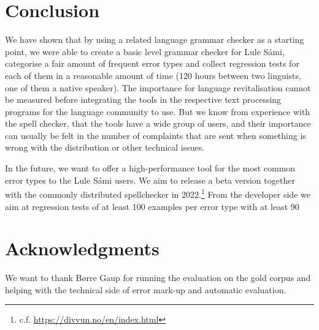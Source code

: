 \documentclass[free]{flammie}
\begin{document}
\section{Conclusion}

We have shown that by using a related language grammar checker as a starting
point, we were able to create a basic level grammar checker for Lule Sámi,
categorise a fair amount of frequent error types and collect regression tests
for each of them in a reasonable amount of time (120 hours between two
linguists, one of them a native speaker).  The importance for language
revitalisation cannot be measured before integrating the tools in the respective
text processing programs for the language community to use. But we know from
experience with the spell checker, that the tools have a wide group of users,
and their importance can usually be felt in the number of complaints that are
sent when something is wrong with the distribution or other technical issues.

In the future, we want to offer a high-performance tool for the most common
error types to the Lule Sámi users. We aim to release a beta version together
with the commonly distributed spellchecker in 2022.\footnote{c.f.
\url{https://divvun.no/en/index.html}} From the developer side we aim at
regression tests of at least 100 examples per error type with at least 90 \


\section*{Acknowledgments}

We want to thank Børre Gaup for running the evaluation on the gold corpus and
helping with the technical side of error mark-up and automatic evaluation.




\appendix
\end{document}
